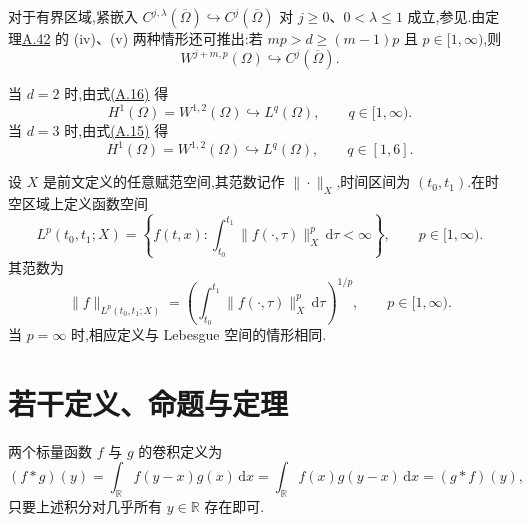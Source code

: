 \begin{note}[连续函数空间的嵌入]\label{note:appendix-a-43}
对于有界区域,紧嵌入 $C^{j,\lambda}(\overline\Omega)\hookrightarrow C^j(\overline\Omega)$ 对 $j\ge0$、$0<\lambda\le1$ 成立,参见\textcite[定理 1.31]{Adams1975}.由定理\hyperref[thm:appendix-a-42]{A.42} 的 (iv)、(v) 两种情形还可推出:若 $mp>d\ge(m-1)p$ 且 $p\in[1,\infty)$,则
\begin{equation}\label{eq:appendix-a-20}
 W^{j+m,p}(\Omega)\hookrightarrow C^j(\overline\Omega).
\end{equation}
\end{note}

\begin{example}\label{ex:appendix-a-44}
当 $d=2$ 时,由式\hyperref[eq:appendix-a-16]{(A.16)} 得
\begin{equation}\label{eq:appendix-a-21}
 H^1(\Omega)=W^{1,2}(\Omega)\hookrightarrow L^q(\Omega),
 \qquad q\in[1,\infty).
\end{equation}
当 $d=3$ 时,由式\hyperref[eq:appendix-a-15]{(A.15)} 得
\begin{equation}\label{eq:appendix-a-22}
 H^1(\Omega)=W^{1,2}(\Omega)\hookrightarrow L^q(\Omega),
 \qquad q\in[1,6].
\end{equation}
\end{example}

\begin{note}[时空区域上的函数空间]\label{note:appendix-a-45}
设 $X$ 是前文定义的任意赋范空间,其范数记作 $\|\cdot\|_X$,时间区间为 $(t_0,t_1)$.在时空区域上定义函数空间
\[
 L^p(t_0,t_1;X)=\left\{f(t,x):\int_{t_0}^{t_1}\|f(\cdot,\tau)\|_X^p\,\mathrm d\tau<\infty\right\},
 \qquad p\in[1,\infty).
\]
其范数为
\[
 \|f\|_{L^p(t_0,t_1;X)}=
 \left(\int_{t_0}^{t_1}\|f(\cdot,\tau)\|_X^p\,\mathrm d\tau\right)^{1/p},
 \qquad p\in[1,\infty).
\]
当 $p=\infty$ 时,相应定义与 Lebesgue 空间的情形相同.
\end{note}

\section{若干定义、命题与定理}\label{sec:appendix-a-statements-theorems}

\begin{note}[卷积]\label{note:appendix-a-46}
两个标量函数 $f$ 与 $g$ 的卷积定义为
\[
 (f*g)(y)=\int_{\mathbb R}f(y-x)g(x)\,\mathrm dx
 =\int_{\mathbb R}f(x)g(y-x)\,\mathrm dx=(g*f)(y),
\]
只要上述积分对几乎所有 $y\in\mathbb R$ 存在即可.
\end{note}

